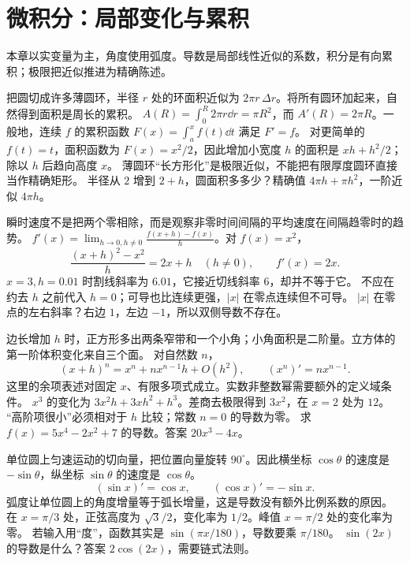 \chapter{微积分：局部变化与累积}
本章以实变量为主，角度使用弧度。导数是局部线性近似的系数，积分是有向累积；极限把近似推进为精确陈述。

\idea 把圆切成许多薄圆环，半径 $r$ 处的环面积近似为 $2\pi r\,\Delta r$。将所有圆环加起来，自然得到面积是周长的累积。
\mathpart $A(R)=\int_0^R2\pi r\dd r=\pi R^2$，而 $A'(R)=2\pi R$。一般地，连续 $f$ 的累积函数 $F(x)=\int_a^x f(t)\dd t$ 满足 $F'=f$。
\examplepart 对更简单的 $f(t)=t$，面积函数为 $F(x)=x^2/2$，因此增加小宽度 $h$ 的面积是 $xh+h^2/2$；除以 $h$ 后趋向高度 $x$。
\pitfall 薄圆环“长方形化”是极限近似，不能把有限厚度圆环直接当作精确矩形。
\exercise 半径从 $2$ 增到 $2+h$，圆面积多多少？精确值 $4\pi h+\pi h^2$，一阶近似 $4\pi h$。
\nextlesson

\idea 瞬时速度不是把两个零相除，而是观察非零时间间隔的平均速度在间隔趋零时的趋势。
\mathpart $f'(x)=\lim_{h\to0,h\ne0}\frac{f(x+h)-f(x)}h$。对 $f(x)=x^2$，
\[\frac{(x+h)^2-x^2}{h}=2x+h\quad(h\ne0),\qquad f'(x)=2x.\]
\examplepart $x=3,h=0.01$ 时割线斜率为 $6.01$，它接近切线斜率 $6$，却并不等于它。
\pitfall 不应在约去 $h$ 之前代入 $h=0$；可导也比连续更强，$|x|$ 在零点连续但不可导。
\exercise $|x|$ 在零点的左右斜率？右边 $1$，左边 $-1$，所以双侧导数不存在。
\nextlesson

\idea 边长增加 $h$ 时，正方形多出两条窄带和一个小角；小角面积是二阶量。立方体的第一阶体积变化来自三个面。
\mathpart 对自然数 $n$，
\[(x+h)^n=x^n+nx^{n-1}h+O(h^2),\qquad (x^n)'=nx^{n-1}.\]
这里的余项表述对固定 $x$、有限多项式成立。实数非整数幂需要额外的定义域条件。
\examplepart $x^3$ 的变化为 $3x^2h+3xh^2+h^3$。差商去极限得到 $3x^2$，在 $x=2$ 处为 $12$。
\pitfall “高阶项很小”必须相对于 $h$ 比较；常数 $n=0$ 的导数为零。
\exercise 求 $f(x)=5x^4-2x^2+7$ 的导数。答案 $20x^3-4x$。
\nextlesson

\idea 单位圆上匀速运动的切向量，把位置向量旋转 $90^\circ$。因此横坐标 $\cos\theta$ 的速度是 $-\sin\theta$，纵坐标 $\sin\theta$ 的速度是 $\cos\theta$。
\mathpart
\[(\sin x)'=\cos x,\qquad (\cos x)'=-\sin x.\]
弧度让单位圆上的角度增量等于弧长增量，这是导数没有额外比例系数的原因。
\examplepart 在 $x=\pi/3$ 处，正弦高度为 $\sqrt3/2$，变化率为 $1/2$。峰值 $x=\pi/2$ 处的变化率为零。
\pitfall 若输入用“度”，函数其实是 $\sin(\pi x/180)$，导数要乘 $\pi/180$。
\exercise $\sin(2x)$ 的导数是什么？答案 $2\cos(2x)$，需要链式法则。
\nextlesson

